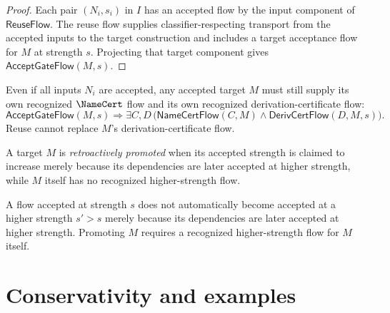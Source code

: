 \begin{proof}
Each pair $(N_i,s_i)$ in $I$ has an accepted flow by the input component of $\mathsf{ReuseFlow}$. The reuse flow supplies classifier-respecting transport from the accepted inputs to the target construction and includes a target acceptance flow for $M$ at strength $s$. Projecting that target component gives $\mathsf{AcceptGateFlow}(M,s)$.
\end{proof}

\begin{corollary}
\label{cor:derivcert-generated-reuse-does-not-erase-obligations}
Even if all inputs $N_i$ are accepted, any accepted target $M$ must still supply its own recognized $\NameCert$ flow and its own recognized derivation-certificate flow:
$$
  \mathsf{AcceptGateFlow}(M,s)
  \Longrightarrow
  \exists C,D\,
  \big(
    \mathsf{NameCertFlow}(C,M)
    \wedge
    \mathsf{DerivCertFlow}(D,M,s)
  \big).
$$
Reuse cannot replace $M$'s derivation-certificate flow.
\end{corollary}

\begin{definition}
\label{def:derivcert-generated-retroactive-promotion}
A target $M$ is \emph{retroactively promoted} when its accepted strength is claimed to increase merely because its dependencies are later accepted at higher strength, while $M$ itself has no recognized higher-strength flow.
\end{definition}

\begin{principle}
\label{prin:derivcert-generated-no-retroactive-promotion}
A flow accepted at strength $s$ does not automatically become accepted at a higher strength $s'>s$ merely because its dependencies are later accepted at higher strength. Promoting $M$ requires a recognized higher-strength flow for $M$ itself.
\end{principle}

\section{Conservativity and examples}
\label{sec:derivcert-generated-conservativity-examples}

